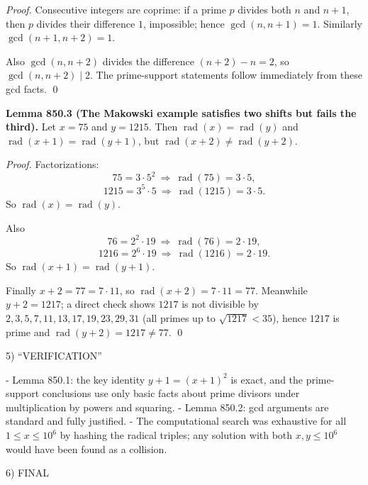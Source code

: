 \emph{Proof.}
Consecutive integers are coprime: if a prime $p$ divides both $n$ and $n+1$, then $p$ divides their difference $1$, impossible; hence $\gcd(n,n+1)=1$. Similarly $\gcd(n+1,n+2)=1$.

Also $\gcd(n,n+2)$ divides the difference $(n+2)-n=2$, so $\gcd(n,n+2)\mid 2$. The prime-support statements follow immediately from these gcd facts. \qed

\textbf{Lemma 850.3 (The Makowski example satisfies two shifts but fails the third).}
Let $x=75$ and $y=1215$. Then $\operatorname{rad}(x)=\operatorname{rad}(y)$ and $\operatorname{rad}(x+1)=\operatorname{rad}(y+1)$, but $\operatorname{rad}(x+2)\ne \operatorname{rad}(y+2)$.

\emph{Proof.}
Factorizations:
\[
75=3\cdot 5^2\ \Rightarrow\ \operatorname{rad}(75)=3\cdot 5,
\]
\[
1215=3^5\cdot 5\ \Rightarrow\ \operatorname{rad}(1215)=3\cdot 5.
\]
So $\operatorname{rad}(x)=\operatorname{rad}(y)$.

Also
\[
76=2^2\cdot 19\ \Rightarrow\ \operatorname{rad}(76)=2\cdot 19,
\]
\[
1216=2^6\cdot 19\ \Rightarrow\ \operatorname{rad}(1216)=2\cdot 19.
\]
So $\operatorname{rad}(x+1)=\operatorname{rad}(y+1)$.

Finally $x+2=77=7\cdot 11$, so $\operatorname{rad}(x+2)=7\cdot 11=77$. Meanwhile $y+2=1217$; a direct check shows $1217$ is not divisible by $2,3,5,7,11,13,17,19,23,29,31$ (all primes up to $\sqrt{1217}<35$), hence $1217$ is prime and $\operatorname{rad}(y+2)=1217\ne 77$. \qed

5) “VERIFICATION”

- Lemma 850.1: the key identity $y+1=(x+1)^2$ is exact, and the prime-support conclusions use only basic facts about prime divisors under multiplication by powers and squaring.
- Lemma 850.2: gcd arguments are standard and fully justified.
- The computational search was exhaustive for all $1\le x\le 10^6$ by hashing the radical triples; any solution with both $x,y\le 10^6$ would have been found as a collision.

6) FINAL

